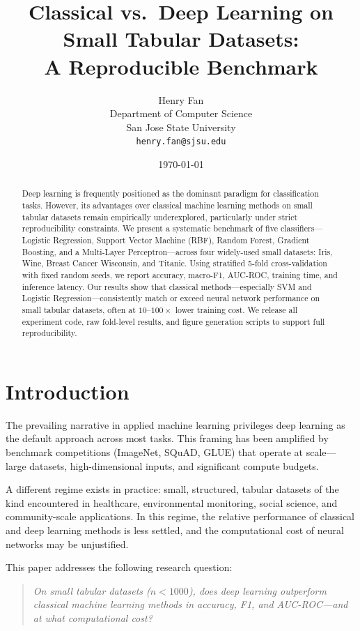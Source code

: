 \documentclass[10pt,twocolumn]{article}
\title{%
  \textbf{Classical vs.\ Deep Learning on Small Tabular Datasets:}\\
  A Reproducible Benchmark
}
\author{%
  Henry Fan \\
  Department of Computer Science \\
  San Jose State University \\
  \texttt{henry.fan@sjsu.edu}
}
\date{\today}
\begin{document}
\maketitle

\begin{abstract}
Deep learning is frequently positioned as the dominant paradigm for classification tasks. 
However, its advantages over classical machine learning methods on small tabular datasets 
remain empirically underexplored, particularly under strict reproducibility constraints.
We present a systematic benchmark of five classifiers—Logistic Regression, Support Vector 
Machine (RBF), Random Forest, Gradient Boosting, and a Multi-Layer Perceptron—across four 
widely-used small datasets: Iris, Wine, Breast Cancer Wisconsin, and Titanic.
Using stratified 5-fold cross-validation with fixed random seeds, we report accuracy, 
macro-F1, AUC-ROC, training time, and inference latency.
Our results show that classical methods—especially SVM and Logistic Regression—consistently 
match or exceed neural network performance on small tabular datasets, often at $10\text{--}100\times$ 
lower training cost.
We release all experiment code, raw fold-level results, and figure generation scripts
to support full reproducibility.
\end{abstract}

\section{Introduction}

The prevailing narrative in applied machine learning privileges deep learning as the 
default approach across most tasks. This framing has been amplified by benchmark 
competitions (ImageNet, SQuAD, GLUE) that operate at scale—large datasets, 
high-dimensional inputs, and significant compute budgets.

A different regime exists in practice: small, structured, tabular datasets of the kind 
encountered in healthcare, environmental monitoring, social science, and community-scale 
applications. In this regime, the relative performance of classical and deep learning 
methods is less settled, and the computational cost of neural networks may be unjustified.

This paper addresses the following research question:

\begin{quote}
\textit{On small tabular datasets ($n < 1000$), does deep learning outperform classical 
machine learning methods in accuracy, F1, and AUC-ROC—and at what computational cost?}
\end{quote}
\end{document}
